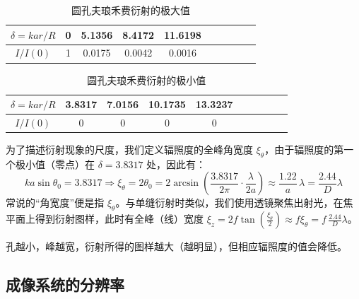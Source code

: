 \documentclass[UTF8]{report}
\theoremstyle{MyLineTheoremStyle} %
\theoremstyle{MyBlockTheoremStyle} %
\theoremstyle{MySubsubsectionStyle} %
\begin{document}
\begin{center}
\noindent\begin{minipage}{0.49\columnwidth}
    \begin{table}[H]\centering
        \caption{圆孔夫琅禾费衍射的极大值}
        \label{圆孔夫琅禾费衍射的极大值}
    \begin{tabular}{cccccccccc}\toprule
        $\delta = kar/R$ & 0 & 5.1356 & 8.4172 & 11.6198 \\
        \midrule
        $I/I(0)$ & 1 & 0.0175 & 0.0042 & 0.0016  \\
        \bottomrule
    \end{tabular}
    \end{table}
\end{minipage}\hfill\begin{minipage}{0.49\columnwidth}
    \begin{table}[H]\centering
        \caption{圆孔夫琅禾费衍射的极小值}
        \label{圆孔夫琅禾费衍射的极小值}
    \begin{tabular}{cccccccccc}\toprule
        $\delta = kar/R$ & 3.8317 & 7.0156 & 10.1735 & 13.3237  \\
        \midrule
        $I/I(0)$ & 0 & 0 & 0 & 0 \\
        \bottomrule
    \end{tabular}
    \end{table}
\end{minipage}\end{center}
为了描述衍射现象的尺度，我们定义辐照度的全峰角宽度 $\xi_{\theta}$，由于辐照度的第一个极小值（零点）在 $\delta = 3.8317$ 处，因此有：
\begin{equation}
ka \sin \theta_0 = 3.8317 \Longrightarrow \xi_\theta = 2 \theta_0 = 2\arcsin \left( \frac{3.8317}{2\pi} \cdot \frac{\lambda}{2a} \right) \approx  \frac{1.22}{\,a\,}\,\lambda = \frac{2.44}{D}\lambda
\end{equation}
常说的“角宽度”便是指 $\xi_\theta$。与单缝衍射时类似，我们使用透镜聚焦出射光，在焦平面上得到衍射图样，此时有全峰（线）宽度 $\xi_z = 2 f\tan \left(\frac{\xi_\theta}{2}\right) \approx f \xi_\theta = f \,\frac{2.44}{D}\lambda$。

孔越小，峰越宽，衍射所得的图样越大（越明显），但相应辐照度的值会降低。

\subsection{成像系统的分辨率}
\end{document}

